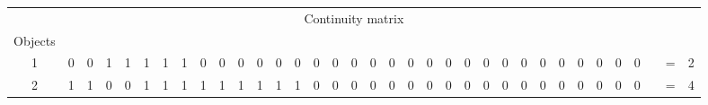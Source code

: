 \documentclass[a4paper,3p,times,authoryear]{elsarticle}
\begin{document}
\begin{table}[H]
{\begin{tabular}{|l|l|l|l|l|l|l|l|l|l|l|l|l|l|l|l|l|l|l|l|l|l|l|l|l|l|l|l|l|l|l|llll|}
\cline{1-32}
\multicolumn{35}{c}{Continuity matrix} \\ 
\multicolumn{1}{l}{Objects} & \multicolumn{1}{l}{} & \multicolumn{1}{l}{} & \multicolumn{1}{l}{} & \multicolumn{1}{l}{} & \multicolumn{1}{l}{} & \multicolumn{1}{l}{} & \multicolumn{1}{l}{} & \multicolumn{1}{l}{} & \multicolumn{1}{l}{} & \multicolumn{1}{l}{} & \multicolumn{1}{l}{} & \multicolumn{1}{l}{} & \multicolumn{1}{l}{} & \multicolumn{1}{l}{} & \multicolumn{1}{l}{} & \multicolumn{1}{l}{} & \multicolumn{1}{l}{} & \multicolumn{1}{l}{} & \multicolumn{1}{l}{} & \multicolumn{1}{l}{} & \multicolumn{1}{l}{} & \multicolumn{1}{l}{} & \multicolumn{1}{l}{} & \multicolumn{1}{l}{} & \multicolumn{1}{l}{} & \multicolumn{1}{l}{} & \multicolumn{1}{l}{} & \multicolumn{1}{l}{} & \multicolumn{1}{l}{} & \multicolumn{1}{l}{} &  &  &  & \multicolumn{1}{l}{} \\ 
\cline{1-32}\cline{34-35}
\multicolumn{1}{|c|}{1} & \multicolumn{1}{c|}{0} & \multicolumn{1}{c|}{0} & \multicolumn{1}{c|}{\cellcolor{blue!25}1} & \multicolumn{1}{c|}{\cellcolor{blue!25}1} & \multicolumn{1}{c|}{\cellcolor{blue!25}1} & \multicolumn{1}{c|}{\cellcolor{blue!25}1} & \multicolumn{1}{c|}{\cellcolor{blue!25}1} & \multicolumn{1}{c|}{0} & \multicolumn{1}{c|}{0} & \multicolumn{1}{c|}{0} & \multicolumn{1}{c|}{0} & \multicolumn{1}{c|}{0} & \multicolumn{1}{c|}{0} & \multicolumn{1}{c|}{0} & \multicolumn{1}{c|}{0} & \multicolumn{1}{c|}{0} & \multicolumn{1}{c|}{0} & \multicolumn{1}{c|}{0} & \multicolumn{1}{c|}{0} & \multicolumn{1}{c|}{0} & \multicolumn{1}{c|}{0} & \multicolumn{1}{c|}{0} & \multicolumn{1}{c|}{0} & \multicolumn{1}{c|}{0} & \multicolumn{1}{c|}{0} & \multicolumn{1}{c|}{0} & \multicolumn{1}{c|}{0} & \multicolumn{1}{c|}{0} & \multicolumn{1}{c|}{0} & \multicolumn{1}{c|}{0} & \multicolumn{1}{c}{0} & \multicolumn{1}{c}{} & \multicolumn{1}{c}{=} & \multicolumn{1}{c|}{\cellcolor{blue!25}2} \\ 
\cline{1-32}\cline{34-35}
\multicolumn{1}{|c|}{2} & \multicolumn{1}{c|}{\cellcolor{blue!25}1} & \multicolumn{1}{c|}{\cellcolor{blue!25}1} & \multicolumn{1}{c|}{0} & \multicolumn{1}{c|}{0} & \multicolumn{1}{c|}{1} & \multicolumn{1}{c|}{\cellcolor{blue!25}1} & \multicolumn{1}{c|}{\cellcolor{blue!25}1} & \multicolumn{1}{c|}{\cellcolor{blue!25}1} & \multicolumn{1}{c|}{\cellcolor{blue!25}1} & \multicolumn{1}{c|}{\cellcolor{blue!25}1} & \multicolumn{1}{c|}{\cellcolor{blue!25}1} & \multicolumn{1}{c|}{\cellcolor{blue!25}1} & \multicolumn{1}{c|}{\cellcolor{blue!25}1} & \multicolumn{1}{c|}{0} & \multicolumn{1}{c|}{0} & \multicolumn{1}{c|}{0} & \multicolumn{1}{c|}{0} & \multicolumn{1}{c|}{0} & \multicolumn{1}{c|}{0} & \multicolumn{1}{c|}{0} & \multicolumn{1}{c|}{0} & \multicolumn{1}{c|}{0} & \multicolumn{1}{c|}{0} & \multicolumn{1}{c|}{0} & \multicolumn{1}{c|}{0} & \multicolumn{1}{c|}{0} & \multicolumn{1}{c|}{0} & \multicolumn{1}{c|}{0} & \multicolumn{1}{c|}{0} & \multicolumn{1}{c|}{0} & \multicolumn{1}{c}{0} & \multicolumn{1}{c}{} & \multicolumn{1}{c}{=} & \multicolumn{1}{c|}{\cellcolor{blue!25}4} \\ 

\end{tabular}}
\end{table}
\end{document}
